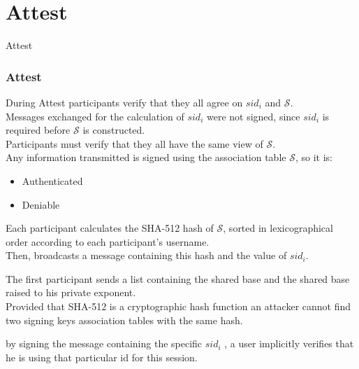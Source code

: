 \section{Attest}

\begin{frame}
\Huge{\centerline{Attest}}
\end{frame}

\begin{frame}
  \frametitle{Attest}
  During Attest participants verify that they all agree on $sid_i$ and $\mathcal{S}$.\\[0.3cm]
  
  Messages exchanged for the calculation of $sid_i$ were not signed, since $sid_i$ is required before $\mathcal{S}$ is constructed.\\[0.3cm]
  
  Participants must verify that they all have the same view of $\mathcal{S}$.\\[0.3cm]

  Any information transmitted is signed using the association table $\mathcal{S}$, so it is:
  \begin{itemize}
    \item Authenticated
    \item Deniable
  \end{itemize}
  
\end{frame}

\begin{frame}
  Each participant calculates the SHA-512 hash of $\mathcal{S}$, sorted in lexicographical order according to each participant's username.\\[0.3cm]
  
  Then, broadcasts a message containing this hash and the value of $sid_i$.
  
  The first participant sends a list containing the shared base and the shared base raised to his private exponent.\\[0.3cm]
  
  Provided that SHA-512 is a cryptographic hash function an attacker cannot find two signing keys association tables with the same hash.
  
  by signing the message containing the specific $sid_i$ , a user implicitly verifies that he is using that particular id for this session.
\end{frame}